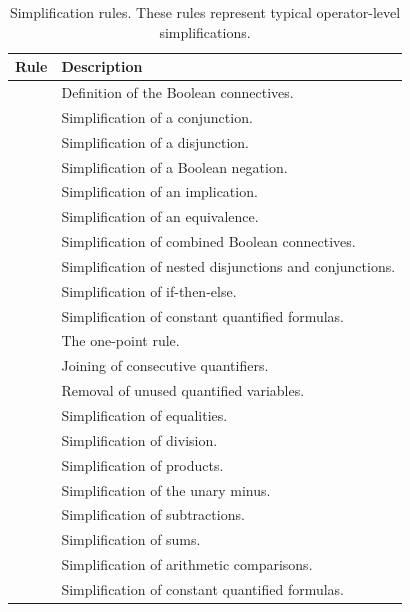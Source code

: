 \begin{xltabular}{\linewidth}{l X}
\caption{Simplification rules. These rules represent typical operator-level
simplifications.}
\label{rule-tab:simplification}\\
	Rule & Description \\
	\hline
{} & Definition of the Boolean connectives. \\
 & Simplification of a conjunction. \\
 & Simplification of a disjunction. \\
 & Simplification of a Boolean negation. \\
 & Simplification of an implication. \\
 & Simplification of an equivalence. \\
 & Simplification of combined Boolean connectives. \\
 & Simplification of nested disjunctions and conjunctions. \\
 & Simplification of if-then-else. \\
 & Simplification of constant quantified formulas. \\
 & The one-point rule. \\
 & Joining of consecutive quantifiers. \\
 & Removal of unused quantified variables. \\
 & Simplification of equalities. \\
 & Simplification of division. \\
 & Simplification of products. \\
 & Simplification of the unary minus. \\
 & Simplification of subtractions. \\
 & Simplification of sums. \\
 & Simplification of arithmetic comparisons. \\
 & Simplification of constant quantified formulas. \\
\end{xltabular}

